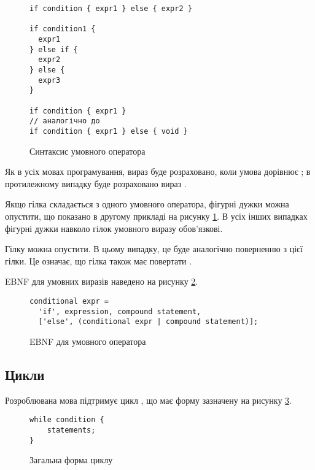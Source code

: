 \documentclass[main.tex]{subfiles}
\begin{document}
\begin{figure}[h]
  \centering
  \begin{verbatim}
if condition { expr1 } else { expr2 }

if condition1 {
  expr1
} else if {
  expr2
} else {
  expr3
}

if condition { expr1 }
// аналогічно до
if condition { expr1 } else { void }
  \end{verbatim}
  \caption{Синтаксис умовного оператора}
  \label{lang:if-syntax}
\end{figure}

Як в усіх мовах програмування, вираз  буде розраховано, коли умова дорівнює ; в протилежному випадку буде розраховано вираз .

Якщо гілка  складається з одного умовного оператора, фігурні дужки можна опустити, що показано в другому прикладі на рисунку \ref{lang:if-syntax}.
В усіх інших випадках фігурні дужки навколо гілок умовного виразу обов'язкові.

Гілку  можна опустити.
В цьому випадку, це буде аналогічно поверненню  з цієї гілки.
Це означає, що гілка  також має повертати .

EBNF для умовних виразів наведено на рисунку \ref{ebnf:if}.

\begin{figure}[h]
  \centering
  \begin{verbatim}
conditional expr =
  'if', expression, compound statement,
  ['else', (conditional expr | compound statement)];
  \end{verbatim}
  \caption{EBNF для умовного оператора}
  \label{ebnf:if}
\end{figure}

\FloatBarrier
\subsection{Цикли}
Розроблювана мова підтримує цикл , що має форму зазначену на рисунку \ref{lang:while}.

\begin{figure}[h]
  \centering
  \begin{verbatim}
while condition {
    statements;
}
  \end{verbatim}
  \caption{Загальна форма циклу }
  \label{lang:while}
\end{figure}
\end{document}
